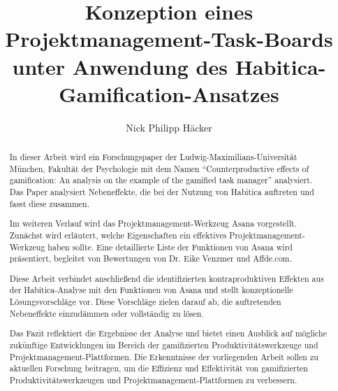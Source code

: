 \documentclass[sigconf, nonacm]{acmart}
\begin{document}
\title{Konzeption eines Projektmanagement-Task-Boards unter Anwendung des Habitica-Gamification-Ansatzes}

\author{Nick Philipp Häcker}




\begin{abstract}
In dieser Arbeit wird ein Forschungspaper der Ludwig-Maximilians-Universität München, Fakultät der Psychologie mit dem Namen \enquote{Counterproductive effects of gamification: An analysis \allowbreak on the example of the gamified task manager} analysiert. Das Paper analysiert Nebeneffekte, die bei der Nutzung von Habitica auftreten und fasst diese zusammen.

Im weiteren Verlauf wird das Projektmanagement-Werkzeug Asana vorgestellt. Zunächst wird erläutert, welche Eigenschaften ein effektives Projektmanagement-Werkzeug haben sollte. Eine detaillierte Liste der Funktionen von Asana wird präsentiert, begleitet von Bewertungen von Dr. Eike Venzmer und Affde.com.

Diese Arbeit verbindet anschließend die identifizierten kontraproduktiven Effekten aus der Habitica-Analyse mit den Funktionen von Asana und stellt konzeptionelle Lösungsvorschläge vor. Diese Vorschläge zielen darauf ab, die auftretenden Nebeneffekte einzudämmen oder vollständig zu lösen.

Das Fazit reflektiert die Ergebnisse der Analyse und bietet einen Ausblick auf mögliche zukünftige Entwicklungen im Bereich der gamifizierten Produktivitätswerkzeuge und Projektmanagement-Plattformen. Die Erkenntnisse der vorliegenden Arbeit sollen zu aktuellen Forschung beitragen, um die Effizienz und Effektivität von gamifizierten Produktivitätswerkzeugen und Projektmanagement-Plattformen zu verbessern.
\end{abstract}

\maketitle
\end{document}
